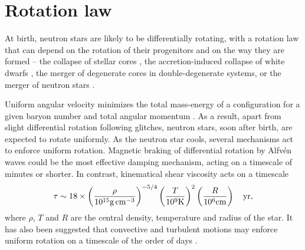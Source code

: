 \documentclass[12pt]{article}
\begin{document}
\vskip0.8cm
\section{Rotation law}
\label{RotEquil}

At birth, neutron stars are likely to be differentially rotating, 
with a rotation law that can depend on the rotation of their 
progenitors and on the way they are formed --  the collapse of 
stellar cores \cite{ZM97,Liu02b,AW05},
the accretion-induced collapse of white dwarfs \cite{LL01}, 
the merger of degenerate cores in double-degenerate systems, or 
the merger of neutron stars \cite{RS99,SU00,OR02,SUK02}.

Uniform angular velocity minimizes
the total mass-energy of a configuration for a given baryon number and
total angular momentum \cite{Boyer66,Hartle67}. As a result, 
apart from slight differential rotation following glitches, 
neutron stars, soon after birth, are expected to rotate uniformly. 
As the neutron star cools, several mechanisms act to enforce uniform
rotation. Magnetic braking of differential rotation by Alfv{\'e}n waves 
\cite{Shapiro01,CSS03,LS04} could be the most effective damping
mechanism, acting on a timescale of minutes or shorter. 
 In contrast, 
kinematical shear viscosity acts on a timescale 
\cite{FI76,FI79,Cutler87}
\begin{equation}
\tau \sim 18 \times \left( \frac{\rho}{10^{15}{\rm
g\,cm^{-3}}}\right)^{-5/4}
          \left(\frac{T}{10^9 {\rm K}}\right)^2
          \left(\frac{R}{10^6 {\rm cm}}\right) \ \ \ {\rm yr,}
\end{equation}
where $\rho$, $T$ and $R$ are the central density, temperature and
radius of the star.  It has also been suggested that convective and
turbulent motions may enforce uniform rotation on a timescale of the
order of days \cite{Hegyi77}.  


\end{document}
